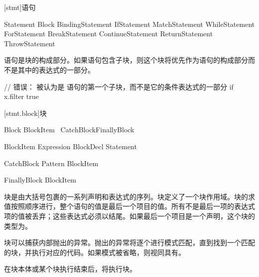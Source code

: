 
[stmt]{语句}

\begin{bnf}{Statement}
    Block \br
    BindingStatement \br
    IfStatement \br
    MatchStatement \br
    WhileStatement \br
    ForStatement \br
    BreakStatement \br
    ContinueStatement \br
    ReturnStatement \br
    ThrowStatement
\end{bnf}

\pnum
语句是块的构成部分。如果语句包含子块，则这个块将优先作为语句的构成部分而不是其中的表达式的一部分。\enterexample

\begin{codeblock}
// 错误：  被认为是  语句的第一个子块，而不是它的条件表达式的一部分
if x.filter{ true }
\end{codeblock}

\exitexample

[stmt.block]{块}

\begin{bnf}{Block}
    \terminal{\{} BlockItem\bnfs\ \terminal{\}} CatchBlock\bnfs FinallyBlock\bnfq
\end{bnf}

\begin{bnf}{BlockItem}
    Expression \terminal{;}\bnfq \br
    BlockDecl \br
    Statement
\end{bnf}

\begin{bnf}{CatchBlock}
     Pattern\bnfq \terminal{\{} BlockItem\bnfs\ \terminal{\}}
\end{bnf}

\begin{bnf}{FinallyBlock}
     \terminal{\{} BlockItem\bnfs\ \terminal{\}}
\end{bnf}

\pnum
块是由大括号包裹的一系列声明和表达式的序列。块定义了一个块作用域。块的求值按照顺序进行，整个语句的值是最后一个项目的值。所有不是最后一项的表达式项的值被丢弃；这些表达式必须以\tcode{;}结尾。如果最后一个项目是一个声明，这个块的类型为。

\pnum
{}块可以捕获内部抛出的异常。抛出的异常将逐个进行模式匹配，直到找到一个匹配的块，并执行对应的代码。如果模式被省略，则视同具有\tcode{_}。

\pnum
在块本体或某个块执行结束后，将执行块。

